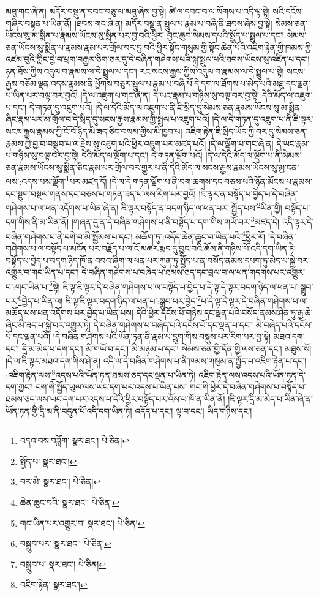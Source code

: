མཐུ་གང་ཞེ་ན། མདོར་བསྡུ་ན་དབང་བཅུ་ལ་མཐུ་ཞེས་བྱ་སྟེ། ཚེ་ལ་དབང་བ་ལ་སོགས་པ་འདི་ལྟ་སྟེ། སའི་དངོས་གཞིར་བསྟན་པ་ཡིན་ནོ། །ཐབས་གང་ཞེ་ན། མདོར་བསྡུ་ན་སྤྲུལ་པ་རྣམ་པ་བཞི་ནི་ཐབས་ཞེས་བྱ་སྟེ། སེམས་ཅན་ཡོངས་སུ་མ་སྨིན་པ་རྣམས་ཡོངས་སུ་སྨིན་པར་བྱ་བའི་ཕྱིར། བྱང་ཆུབ་སེམས་དཔའི་སྤྱོད་པ་སྤྲུལ་པ་དང་། སེམས་ཅན་ཡོངས་སུ་སྨིན་པ་རྣམས་རྣམ་པར་གྲོལ་བར་བྱ་བའི་ཕྱིར་སྟོང་གསུམ་གྱི་སྟོང་ཆེན་པོའི་འཇིག་རྟེན་གྱི་ཁམས་ཀྱི་འཛམ་བུའི་གླིང་བྱེ་བ་ཕྲག་བརྒྱར་ཅིག་ཅར་དུ་དེ་བཞིན་གཤེགས་པའི་སྐུ་སྤྲུལ་པའི་ཐབས་ཡོངས་སུ་འཛིན་པ་དང་། ཉན་ཐོས་ཀྱིས་འདུལ་བ་རྣམས་ལ་དེ་སྤྲུལ་པ་དང་། རང་སངས་རྒྱས་ཀྱིས་འདུལ་བ་རྣམས་ལ་དེ་སྤྲུལ་པ་སྟེ། སངས་རྒྱས་བཅོམ་ལྡན་འདས་རྣམས་ནི་ཕྱོགས་བཅུར་སྤྲུལ་པ་རྣམ་པ་བཞི་པོ་དེ་དག་ལ་ཐོགས་པ་མེད་པའི་མཐུ་དང་ལྡན་པ་ཡིན་པར་བལྟ་བར་བྱའོ། །དེ་ལ་འཇུག་པ་གང་ཞེ་ན། དེ་ཡང་རྣམ་པ་གཉིས་སུ་བལྟ་བར་བྱ་སྟེ། དེའི་མོད་ལ་འཇུག་པ་དང་། དེ་གཏན་དུ་འཇུག་པའོ། །དེ་ལ་དེའི་མོད་ལ་འཇུག་པ་ནི་ཇི་སྲིད་དུ་སེམས་ཅན་རྣམས་ཡོངས་སུ་མ་སྨིན་ཞིང་རྣམ་པར་མ་གྲོལ་བ་དེ་སྲིད་དུ་སངས་རྒྱས་རྣམས་ཀྱི་སྤྲུལ་པ་འཇུག་པའོ། །དེ་ལ་དེ་གཏན་དུ་འཇུག་པ་ནི་ཇི་ལྟར་སངས་རྒྱས་རྣམས་ཀྱི་ངོ་བོ་ཉིད་མི་ཟད་ཅིང་བསམ་གྱིས་མི་ཁྱབ་པ། འཇིག་རྟེན་ཇི་སྲིད་ཡོད་ཀྱི་བར་དུ་སེམས་ཅན་རྣམས་ཀྱི་བྱ་བ་བསྒྲུབ་པ་ལ་རྗེས་སུ་འཇུག་པའི་ཕྱིར་འཇུག་པར་མཛད་པའོ། །དེ་ལ་ལྡོག་པ་གང་ཞེ་ན། དེ་ཡང་རྣམ་པ་གཉིས་སུ་བལྟ་བར་བྱ་སྟེ། དེའི་མོད་ལ་ལྡོག་པ་དང་། དེ་གཏན་ལྡོག་པའོ། །དེ་ལ་དེའི་མོད་ལ་ལྡོག་པ་ནི་སེམས་ཅན་རྣམས་ཡོངས་སུ་སྨིན་ཅིང་རྣམ་པར་གྲོལ་བར་གྱུར་པ་ནི་དེའི་མོད་ལ་སངས་རྒྱས་རྣམས་ཡོངས་སུ་མྱ་ངན་ལས་:འདས་པས་ལྡོག་\footnote{འདའ་བས་བཟློག་  སྣར་ཐང་།  པེ་ཅིན། }པར་མཛད་དོ། །དེ་ལ་དེ་གཏན་ལྡོག་པ་ནི་བག་ཆགས་དང་བཅས་པའི་ཉོན་མོངས་པ་རྣམས་དང་སྡུག་བསྔལ་གནས་དང་བཅས་པ་གཏན་ཟད་པ་ལས་རིག་པར་བྱའོ། །ཇི་ལྟར་ན་བསྟོད་པ་བྱེད་པ་དེ་བཞིན་གཤེགས་པ་ལ་ཕན་འདོགས་པ་ཡིན་ཞེ་ན། ཇི་ལྟར་བསྟོད་ན་བདག་ཉིད་ལ་ཕན་པར་:སྤྱོད་པས་\footnote{སྤྱོད་པ་  སྣར་ཐང་། }ཡིན་གྱི། བསྟོད་པ་དག་གིས་ནི་མ་ཡིན་ནོ། །གཞན་དུ་ན་དེ་བཞིན་གཤེགས་པ་ནི་བསྟོད་པ་དག་གིས་གཡོ་བར་\footnote{བར་མི་  སྣར་ཐང་།  པེ་ཅིན། }མཛད་དེ། འདི་ལྟར་དེ་བཞིན་གཤེགས་པ་ནི་དགེ་བ་མི་སྤྱོམས་པ་དང་། མཆོག་ཏུ་:འདོད་ཆེན་ཆུང་བ་ཡིན་པའི་\footnote{ཆེན་ཆུང་བའི་  སྣར་ཐང་།  པེ་ཅིན། }ཕྱིར་རོ། །དེ་བཞིན་གཤེགས་པ་ལ་བསྟོད་པ་མངོན་པར་བརྗོད་པ་ལ་ངོ་མཚར་རྨད་དུ་བྱུང་བའི་ཆོས་ནི་གཉིས་པོ་འདི་དག་ཡིན་ཏེ། བསྟོད་པ་བྱེད་པ་བདག་ཉིད་ཁོ་ན་འབའ་ཞིག་ལ་ཕན་པར་ཀུན་ཏུ་སྤྱོད་པ་ན་བསོད་ནམས་དཔག་ཏུ་མེད་པ་སྐྱེ་བར་འགྱུར་བ་གང་ཡིན་པ་དང་། དེ་བཞིན་གཤེགས་པ་བཞེད་པ་ཐམས་ཅད་དང་བྲལ་བ་ལ་ཕན་གདགས་པར་འགྱུར་བ་:གང་ཡིན་པ་\footnote{གང་ཡིན་པར་འགྱུར་བ་  སྣར་ཐང་།  པེ་ཅིན། }སྟེ། ཇི་ལྟ་ཇི་ལྟར་དེ་བཞིན་གཤེགས་པ་ལ་བསྟོད་པ་བྱེད་པ་དེ་ལྟ་དེ་ལྟར་བདག་ཉིད་ལ་ཕན་པ་:སྒྲུབ་པར་\footnote{བསྒྲུབ་པར་  སྣར་ཐང་།  པེ་ཅིན། }བྱེད་པ་ཡིན་ལ། ཇི་ལྟ་ཇི་ལྟར་བདག་ཉིད་ལ་ཕན་པ་:སྒྲུབ་པར་བྱེད་\footnote{བསྒྲུབ་པ་  སྣར་ཐང་།  པེ་ཅིན། }པ་དེ་ལྟ་དེ་ལྟར་དེ་བཞིན་གཤེགས་པ་ལ་མཆོད་པས་ཕན་འདོགས་པར་བྱེད་པ་ཡིན་པས། དེའི་ཕྱིར་དངོས་པོ་གཉིས་དང་ལྡན་པའི་བསོད་ནམས་ཤིན་ཏུ་རྒྱ་ཆེ་ཞིང་མི་ཟད་པ་སྐྱེ་བར་འགྱུར་ཏེ། དེ་བཞིན་གཤེགས་པ་བཞེད་པའི་དངོས་པོ་དང་ལྡན་པ་དང་། མི་བཞེད་པའི་དངོས་པོ་དང་ལྡན་པའོ། །དེ་བཞིན་གཤེགས་པའི་ཡོན་ཏན་ནི་རྣམ་པ་དྲུག་གིས་བསྡུས་པར་རིག་པར་བྱ་སྟེ། མཐའ་དག་དང་། དྲི་མ་མེད་པ་དག་དང་། མི་གཡོ་བ་དང་། མི་མཉམ་པ་དང་། སེམས་ཅན་གྱི་དོན་གྱི་ལས་ཅན་དང་། མཐུས་སོ། །དེ་ལ་ཇི་ལྟར་མཐའ་དག་གིས་ཤེ་ན། འདི་ལ་དེ་བཞིན་གཤེགས་པ་ནི་ཁམས་གསུམ་ན་སྤྱོད་པ་འཇིག་རྟེན་པ་དང་། :འཇིག་རྟེན་ལས་\footnote{འཇིག་རྟེན་  སྣར་ཐང་། }འདས་པའི་ཡོན་ཏན་ཐམས་ཅད་དང་ལྡན་པ་ཡིན་ཏེ། འཇིག་རྟེན་ལས་འདས་པའི་ཡོན་ཏན་དེ་དག་ཀྱང་། ངག་གི་སྤྱོད་ཡུལ་ལས་ཡང་དག་པར་འདས་པ་ཡིན་པས། གང་གི་ཕྱིར་དེ་བཞིན་གཤེགས་པ་བསྟོད་པ་ཐམས་ཅད་ལས་ཡང་དག་པར་འདས་པ་དེའི་ཕྱིར་བསྟོད་པར་འོས་པ་ཁོ་ན་ཡིན་ནོ། །ཇི་ལྟར་དྲི་མ་མེད་པ་ཡིན་ཞེ་ན། ཡོན་ཏན་གྱི་དྲི་མ་ནི་བདུན་པོ་འདི་དག་ཡིན་ཏེ། འདོད་པ་དང་། ལྟ་བ་དང་། ཡིད་གཉིས་དང་། 